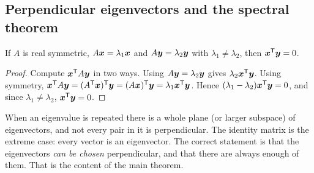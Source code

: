 \subsection{Perpendicular eigenvectors and the spectral theorem}

\begin{theorem}\label{thm:u29-orth}
If $A$ is real symmetric, $A\boldsymbol{x}=\lambda_1\boldsymbol{x}$ and $A\boldsymbol{y}=\lambda_2\boldsymbol{y}$ with
$\lambda_1\ne\lambda_2$, then $\boldsymbol{x}^{\mathsf{T}}\boldsymbol{y}=0$.
\end{theorem}
\begin{proof}
Compute $\boldsymbol{x}^{\mathsf{T}} A\boldsymbol{y}$ in two ways. Using $A\boldsymbol{y}=\lambda_2\boldsymbol{y}$ gives $\lambda_2\boldsymbol{x}^{\mathsf{T}}\boldsymbol{y}$.
Using symmetry, $\boldsymbol{x}^{\mathsf{T}} A\boldsymbol{y}=(A^{\mathsf{T}}\boldsymbol{x})^{\mathsf{T}}\boldsymbol{y}=(A\boldsymbol{x})^{\mathsf{T}}\boldsymbol{y}=\lambda_1\boldsymbol{x}^{\mathsf{T}}\boldsymbol{y}$.
Hence $(\lambda_1-\lambda_2)\boldsymbol{x}^{\mathsf{T}}\boldsymbol{y}=0$, and since $\lambda_1\ne\lambda_2$, $\boldsymbol{x}^{\mathsf{T}}\boldsymbol{y}=0$.
\end{proof}

When an eigenvalue is repeated there is a whole plane (or larger subspace) of eigenvectors,
and not every pair in it is perpendicular. The identity matrix is the extreme case: every
vector is an eigenvector. The correct statement is that the eigenvectors \emph{can be chosen}
perpendicular, and that there are always enough of them. That is the content of the main
theorem.

